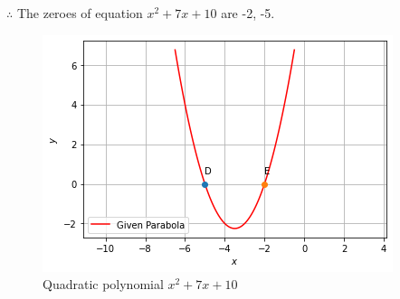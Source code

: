 \documentclass[journal,12pt,twocolumn]{IEEEtran}
\begin{document}
$\therefore$ The zeroes of equation $x^2+7x+10$ are -2, -5.

\begin{figure}
    \centering
    \includegraphics[width=\columnwidth]{a_5_final.png}
    \caption{Quadratic polynomial $x^2+7x+10$}
    \label{fig:my_label}
\end{figure}
\end{document}
